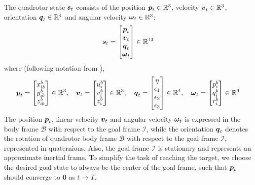 The quadrotor state ${\boldsymbol{s}}_t$ consists of the position ${\boldsymbol{p}}_t \in \mathbb{R}^3$, velocity ${\boldsymbol{v}}_t \in \mathbb{R}^3$, orientation ${\boldsymbol{q}}_t \in \mathbb{R}^4$ and angular velocity ${\boldsymbol{\omega}}_t \in \mathbb{R}^3$:
\begin{equation}
    {\boldsymbol{s}}_t = \begin{bmatrix}
        {\boldsymbol{p}}_t \\
        {\boldsymbol{v}}_t \\
        {\boldsymbol{q}}_t \\
        {\boldsymbol{\omega}}_t \\
    \end{bmatrix} \in \mathbb{R}^{13}
    \label{eq:4_quadrotor_states}
\end{equation}
where (following notation from \cite{Fossen2021}), 
\begin{equation}
    {\boldsymbol{p}}_t = \begin{bmatrix}
        x^b_{ib} \\
        y^b_{ib} \\
        z^b_{ib} 
    \end{bmatrix} \in \mathbb{R}^{3}, \quad
    {\boldsymbol{v}}_t = \begin{bmatrix}
        u^b_{i} \\
        v^b_{i} \\
        z^b_{i} 
    \end{bmatrix} \in \mathbb{R}^{3}, \quad
    {\boldsymbol{q}}_t = \begin{bmatrix}
        \eta \\
        \epsilon_1 \\
        \epsilon_2 \\
        \epsilon_3
    \end{bmatrix} \in \mathbb{R}^{4}, \quad
    {\boldsymbol{\omega}}_t = \begin{bmatrix}
        p^b_{i} \\
        q^b_{i} \\
        r^b_{i} 
    \end{bmatrix} \in \mathbb{R}^{3}
    \label{eq:4_quadrotor_states_detailed}
\end{equation}
The position ${\boldsymbol{p}}_t$, linear velocity ${\boldsymbol{v}}_t$ and angular velocity ${\boldsymbol{\omega}}_t$ is expressed in the body frame $\mathcal{B}$ with respect to the goal frame $\mathcal{I}$, while the orientation ${\boldsymbol{q}}_t$ denotes the rotation of quadrotor body frame $\mathcal{B}$ with respect to the goal frame $\mathcal{I}$, represented in quaternions. Also, the goal frame $\mathcal{I}$ is stationary and represents an approximate inertial frame.
To simplify the task of reaching the target, we choose the desired goal state to always be the center of the goal frame, such that ${\boldsymbol{p}}_t$ should converge to $\boldsymbol{0}$ as $t \rightarrow T$.

